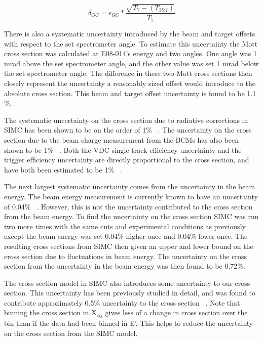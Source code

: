 \begin{equation} \label{eq:gc_uncertainty}
	\delta_{GC} = \epsilon_{GC} * \frac{\sqrt{T_7-(T_{3\&7})}}{T_7}
\end{equation}

There is also a systematic uncertainty introduced by the beam and target offsets with respect to the set spectrometer angle. To estimate this uncertainty the Mott cross section was calculated at E08-014's energy and two angles. One angle was 1 mrad above the set spectrometer angle, and the other value was set 1 mrad below the set spectrometer angle. The difference in these two Mott cross sections then closely represent the uncertainty a reasonably sized offset would introduce to the absolute cross section. This beam and target offset uncertainty is found to be 1.1$\%$.

The systematic uncertainty on the cross section due to radiative corrections in SIMC has been shown to be on the order of 1$\%$ ~\cite{Thesis:Wang}. The uncertainty on the cross section due to the beam charge measurement from the BCMs has also been shown to be 1$\%$ ~\cite{Thesis:Wang}. Both the VDC single track efficiency uncertainty and the trigger efficiency uncertainty are directly proportional to the cross section, and have both been estimated to be 1$\%$ ~\cite{Thesis:Ye}.

The next largest systematic uncertainty comes from the uncertainty in the beam energy. The beam energy measurement is currently known to have an uncertainty of 0.04$\%$ ~\cite{doug}. However, this is not the uncertainty contributed to the cross section from the beam energy. To find the uncertainty on the cross section SIMC was run two more times with the same cuts and experimental conditions as previously except the beam energy was set 0.04$\%$ higher once and 0.04$\%$ lower once. The resulting cross sections from SIMC then given an upper and lower bound on the cross section due to fluctuations in beam energy. The uncertainty on the cross section from the uncertainty in the beam energy was then found to be 0.72$\%$.

The cross section model in SIMC also introduces some uncertainty to our cross section. This uncertainty has been previously studied in detail, and was found to contribute approximately 0.5$\%$ uncertainty to the cross section ~\cite{Thesis:Nguyen}. Note that binning the cross section in X$_{Bj}$ gives less of a change in cross section over the bin than if the data had been binned in E'. This helps to reduce the uncertainty on the cross section from the SIMC model.

